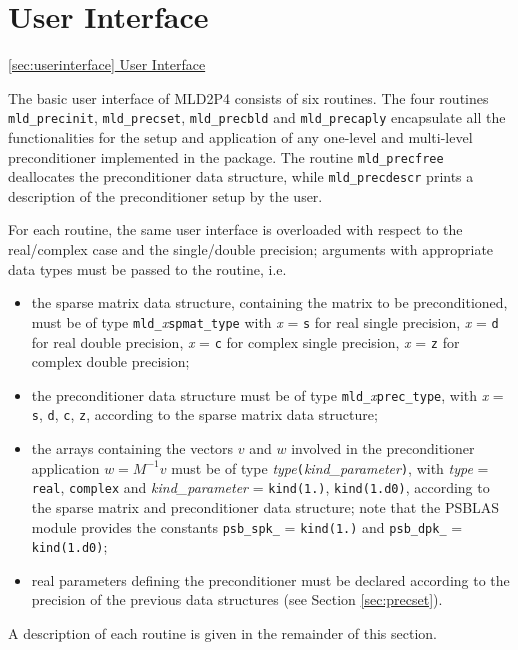 \section{User Interface\label{sec:userinterface}}
         {\underline{\ref{sec:userinterface} User Interface}}

The basic user interface of MLD2P4 consists of six routines. The four routines \verb|mld_precinit|,
\verb|mld_precset|, \verb|mld_precbld| and \verb|mld_precaply| encapsulate all the functionalities for the setup and application of any one-level and multi-level
preconditioner implemented in the package.
The routine \verb|mld_precfree| deallocates the preconditioner data structure, while
\verb|mld_precdescr| prints a description of the preconditioner setup by the user.

For each routine, the same user interface is overloaded with
respect to the real/complex case and the single/double precision;
arguments with appropriate data types must be passed to the routine,
i.e.
\begin{itemize}
\item the sparse matrix data structure, containing the matrix to be
  preconditioned, must be of type \verb|mld_|\emph{x}\verb|spmat_type|
	with \emph{x} = \verb|s| for real single precision, \emph{x} = \verb|d|
	for real double precision, \emph{x} = \verb|c| for complex single precision,
	\emph{x} = \verb|z| for complex double precision;
\item the preconditioner data structure must be of type
  \verb|mld_|\emph{x}\verb|prec_type|, with \emph{x} =    
  \verb|s|, \verb|d|, \verb|c|, \verb|z|, according to the sparse
  matrix data structure;
\item the arrays containing the vectors $v$ and $w$ involved in
  the preconditioner application $w=M^{-1}v$ must be of type   
  \emph{type}\verb|(|\emph{kind\_parameter}\verb|)|, with \emph{type} =
  \verb|real|, \verb|complex| and \emph{kind\_parameter} = \verb|kind(1.)|,
  \verb|kind(1.d0)|, according to the sparse matrix and preconditioner
  data structure; note that the PSBLAS module provides the constants \verb|psb_spk_|
  = \verb|kind(1.)| and \verb|psb_dpk_| = \verb|kind(1.d0)|;
\item real parameters defining the preconditioner must be declared
  according to the precision of the previous data structures
  (see Section \ref{sec:precset}).
\end{itemize}
A description of each routine is given in the remainder of this section.


